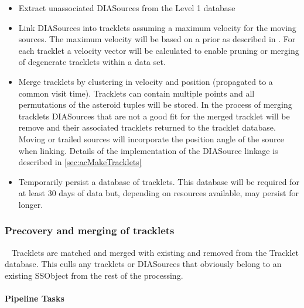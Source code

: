 \begin{itemize}
\item Extract unassociated DIASources from the Level 1 database
\item Link DIASources into tracklets assuming a maximum velocity for the moving sources. The maximum velocity will be based on a prior as described in  \cite{kubica05}. For each tracklet a velocity vector will be calculated to enable pruning or merging of degenerate tracklets within a data set. 
\item Merge tracklets by clustering in velocity and position (propagated to a common visit time). Tracklets can contain multiple points and all permutations of the asteroid tuples will be stored. In the process of merging tracklets DIASources that are not a good fit for the merged tracklet will be remove and their associated tracklets returned to the tracklet database.  Moving or trailed sources will incorporate the position angle of the source when linking. Details of the implementation of the DIASource linkage is described in \ref{sec:acMakeTracklets}
\item Temporarily persist a database of tracklets. This database will be required for at least 30 days of data but, depending on resources available, may persist for longer.
\end{itemize}


\subsubsection{Precovery and merging of tracklets}~
Tracklets are matched and merged with existing \SSObjects and removed from the Tracklet database. This culls any tracklets or DIASources that obviously belong to an existing SSObject from the rest of the processing. 

\paragraph{Pipeline Tasks}

